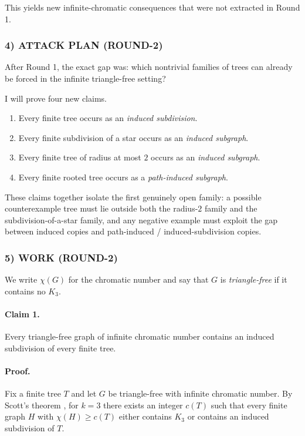 This yields new infinite-chromatic consequences that were not extracted in Round 1.

\subsubsection*{4) ATTACK PLAN (ROUND-2)}
After Round 1, the exact gap was: which nontrivial families of trees can already be forced in the infinite triangle-free setting?

I will prove four new claims.

\begin{enumerate}
\item Every finite tree occurs as an \emph{induced subdivision}.
\item Every finite subdivision of a star occurs as an \emph{induced subgraph}.
\item Every finite tree of radius at most $2$ occurs as an \emph{induced subgraph}.
\item Every finite rooted tree occurs as a \emph{path-induced subgraph}.
\end{enumerate}

These claims together isolate the first genuinely open family: a possible counterexample tree must lie outside both the radius-$2$ family and the subdivision-of-a-star family, and any negative example must exploit the gap between induced copies and path-induced / induced-subdivision copies.

\subsubsection*{5) WORK (ROUND-2)}
We write $\chi(G)$ for the chromatic number and say that $G$ is \emph{triangle-free} if it contains no $K_3$.

\paragraph{Claim 1.} Every triangle-free graph of infinite chromatic number contains an induced subdivision of every finite tree.

\paragraph{Proof.}
Fix a finite tree $T$ and let $G$ be triangle-free with infinite chromatic number.
By Scott's theorem \cite[Theorem~3]{Scott97}, for $k=3$ there exists an integer $c(T)$ such that every finite graph $H$ with $\chi(H)\ge c(T)$ either contains $K_3$ or contains an induced subdivision of $T$.

